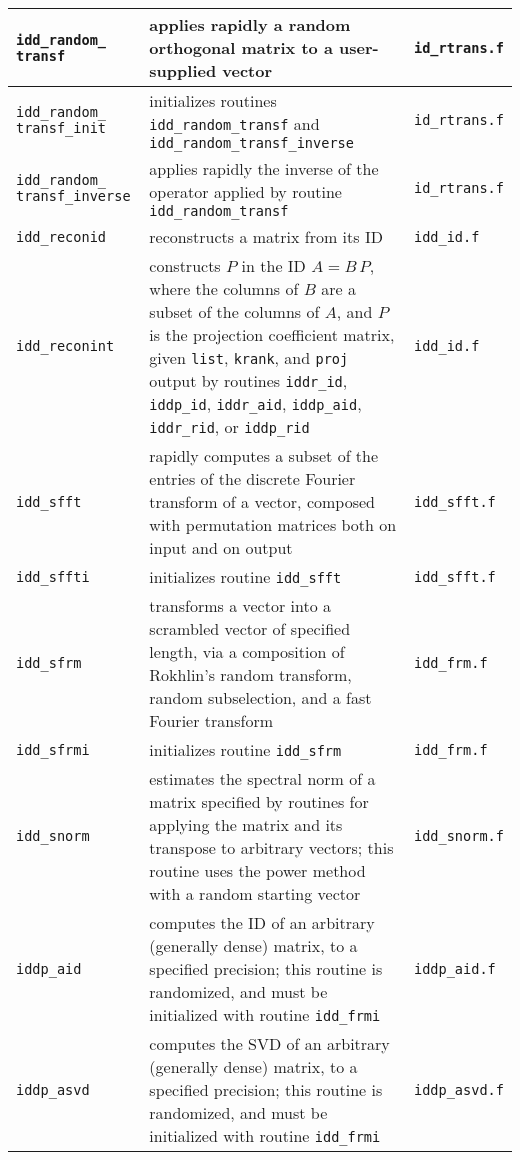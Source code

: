 \documentclass[letterpaper,12pt]{article}
\begin{document}
\begin{center}
\begin{supertabular}{>{\raggedright}p{1.2in} p{.53\textwidth} l}
%
{\tt idd\_random\_} {\tt transf} & applies rapidly a
random orthogonal matrix to a user-supplied vector & {\tt id\_rtrans.f}
\\\hline
%
{\tt idd\_random\_ transf\_init} & \raggedright initializes routines
{\tt idd\_random\_transf} and {\tt idd\_random\_transf\_inverse} &
{\tt id\_rtrans.f} \\\hline
%
{\tt idd\_random\_} {\tt transf\_inverse} & applies
rapidly the inverse of the operator applied by routine
{\tt idd\_random\_transf} & {\tt id\_rtrans.f} \\\hline
%
{\tt idd\_reconid} & reconstructs a matrix from its ID &
{\tt idd\_id.f} \\\hline
%
{\tt idd\_reconint} & constructs $P$ in the ID $A = B \, P$, where the
columns of $B$ are a subset of the columns of $A$, and $P$ is the
projection coefficient matrix, given {\tt list}, {\tt krank}, and
{\tt proj} output by routines {\tt iddr\_id}, {\tt iddp\_id},
{\tt iddr\_aid}, {\tt iddp\_aid}, {\tt iddr\_rid}, or {\tt iddp\_rid} &
{\tt idd\_id.f} \\\hline
%
{\tt idd\_sfft} & rapidly computes a subset of the entries of the
discrete Fourier transform of a vector, composed with permutation
matrices both on input and on output & {\tt idd\_sfft.f} \\\hline
%
{\tt idd\_sffti} & initializes routine {\tt idd\_sfft} &
{\tt idd\_sfft.f} \\\hline
%
{\tt idd\_sfrm} & transforms a vector into a scrambled vector of
specified length, via a composition of Rokhlin's random transform,
random subselection, and a fast Fourier transform & {\tt idd\_frm.f}
\\\hline
%
{\tt idd\_sfrmi} & initializes routine {\tt idd\_sfrm} &
{\tt idd\_frm.f} \\\hline
%
{\tt idd\_snorm} & estimates the spectral norm of a matrix specified by
routines for applying the matrix and its transpose to arbitrary
vectors; this routine uses the power method with a random starting
vector & {\tt idd\_snorm.f} \\\hline
%
{\tt iddp\_aid} & computes the ID of an arbitrary (generally dense)
matrix, to a specified precision; this routine is randomized, and must
be initialized with routine {\tt idd\_frmi} & {\tt iddp\_aid.f}
\\\hline
%
{\tt iddp\_asvd} & computes the SVD of an arbitrary (generally dense)
matrix, to a specified precision; this routine is randomized, and must
be initialized with routine {\tt idd\_frmi} & {\tt iddp\_asvd.f}

\end{supertabular}
\end{center}
\end{document}
